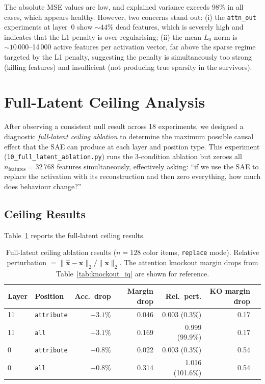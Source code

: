 \documentclass[11pt,a4paper]{article}
\begin{document}
The absolute MSE values are low, and explained variance exceeds 98\% in all cases, which appears
healthy. However, two concerns stand out:
(i) the \texttt{attn\_out} experiments at layer~0 show ${\sim}44\%$ dead features, which is
severely high and indicates that the L1 penalty is over-regularising;
(ii) the mean $L_0$ norm is ${\sim}10\,000$--14\,000 active features per activation vector, far
above the sparse regime targeted by the L1 penalty, suggesting the penalty is simultaneously
too strong (killing features) and insufficient (not producing true sparsity in the survivors).


\section{Full-Latent Ceiling Analysis}
\label{sec:ceiling}

After observing a consistent null result across 18 experiments, we designed a diagnostic
\emph{full-latent ceiling ablation} to determine the maximum possible causal effect that the SAE
can produce at each layer and position type.
This experiment (\texttt{10\_full\_latent\_ablation.py}) runs the 3-condition ablation but zeroes
all $n_{\mathrm{features}} = 32\,768$ features simultaneously,
effectively asking: ``if we use the SAE to replace the activation with its reconstruction and then
zero everything, how much does behaviour change?''

\subsection{Ceiling Results}

Table~\ref{tab:ceiling} reports the full-latent ceiling results.

\begin{table}[ht]
\centering
\caption{Full-latent ceiling ablation results ($n = 128$ color items, \texttt{replace} mode).
  Relative perturbation $= \|\hat{\mathbf{x}} - \mathbf{x}\|_2 / \|\mathbf{x}\|_2$.
  The attention knockout margin drops from Table~\ref{tab:knockout_iq} are shown for reference.}
\label{tab:ceiling}
\begin{tabular}{llrrrrr}
\toprule
Layer & Position & Acc.\ drop & Margin drop & Rel.\ pert. & KO margin drop \\
\midrule
11 & \texttt{attribute} & $+3.1\%$ & 0.046 & 0.003 (0.3\%) & 0.17 \\
11 & \texttt{all}       & $+3.1\%$ & 0.169 & 0.999 (99.9\%) & 0.17 \\
0  & \texttt{attribute} & $-0.8\%$ & 0.022 & 0.003 (0.3\%) & 0.54 \\
0  & \texttt{all}       & $-0.8\%$ & 0.314 & 1.016 (101.6\%) & 0.54 \\
\bottomrule
\end{tabular}
\end{table}
\end{document}
